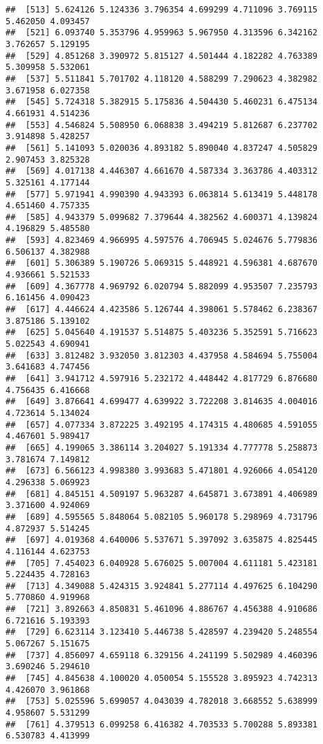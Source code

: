 \documentclass[
]{article}
\begin{document}
\begin{verbatim}
##  [513] 5.624126 5.124336 3.796354 4.699299 4.711096 3.769115 5.462050 4.093457
##  [521] 6.093740 5.353796 4.959963 5.967950 4.313596 6.342162 3.762657 5.129195
##  [529] 4.851268 3.390972 5.815127 4.501444 4.182282 4.763389 5.309958 5.532061
##  [537] 5.511841 5.701702 4.118120 4.588299 7.290623 4.382982 3.671958 6.027358
##  [545] 5.724318 5.382915 5.175836 4.504430 5.460231 6.475134 4.661931 4.514236
##  [553] 4.546824 5.508950 6.068838 3.494219 5.812687 6.237702 3.914898 5.428257
##  [561] 5.141093 5.020036 4.893182 5.890040 4.837247 4.505829 2.907453 3.825328
##  [569] 4.017138 4.446307 4.661670 4.587334 3.363786 4.403312 5.325161 4.177144
##  [577] 5.971941 4.990390 4.943393 6.063814 5.613419 5.448178 4.651460 4.757335
##  [585] 4.943379 5.099682 7.379644 4.382562 4.600371 4.139824 4.196829 5.485580
##  [593] 4.823469 4.966995 4.597576 4.706945 5.024676 5.779836 6.506137 4.382988
##  [601] 5.306389 5.190726 5.069315 5.448921 4.596381 4.687670 4.936661 5.521533
##  [609] 4.367778 4.969792 6.020794 5.882099 4.953507 7.235793 6.161456 4.090423
##  [617] 4.446624 4.423586 5.126744 4.398061 5.578462 6.238367 3.875186 5.139102
##  [625] 5.045640 4.191537 5.514875 5.403236 5.352591 5.716623 5.022543 4.690941
##  [633] 3.812482 3.932050 3.812303 4.437958 4.584694 5.755004 3.641683 4.747456
##  [641] 3.941712 4.597916 5.232172 4.448442 4.817729 6.876680 4.756435 6.416668
##  [649] 3.876641 4.699477 4.639922 3.722208 3.814635 4.004016 4.723614 5.134024
##  [657] 4.077334 3.872225 3.492195 4.174315 4.480685 4.591055 4.467601 5.989417
##  [665] 4.199065 3.386114 3.204027 5.191334 4.777778 5.258873 3.781674 7.149812
##  [673] 6.566123 4.998380 3.993683 5.471801 4.926066 4.054120 4.296338 5.069923
##  [681] 4.845151 4.509197 5.963287 4.645871 3.673891 4.406989 3.371600 4.924069
##  [689] 4.595565 5.848064 5.082105 5.960178 5.298969 4.731796 4.872937 5.514245
##  [697] 4.019368 4.640006 5.537671 5.397092 3.635875 4.825445 4.116144 4.623753
##  [705] 7.454023 6.040928 5.676025 5.007004 4.611181 5.423181 5.224435 4.728163
##  [713] 4.349088 5.424315 3.924841 5.277114 4.497625 6.104290 5.770860 4.919968
##  [721] 3.892663 4.850831 5.461096 4.886767 4.456388 4.910686 6.721616 5.193393
##  [729] 6.623114 3.123410 5.446738 5.428597 4.239420 5.248554 5.067267 5.151675
##  [737] 4.856097 4.659118 6.329156 4.241199 5.502989 4.460396 3.690246 5.294610
##  [745] 4.845638 4.100020 4.050054 5.155528 3.895923 4.742313 4.426070 3.961868
##  [753] 5.025596 5.699057 4.043039 4.782018 3.668552 5.638999 4.958607 5.531299
##  [761] 4.379513 6.099258 6.416382 4.703533 5.700288 5.893381 6.530783 4.413999

\end{verbatim}
\end{document}
